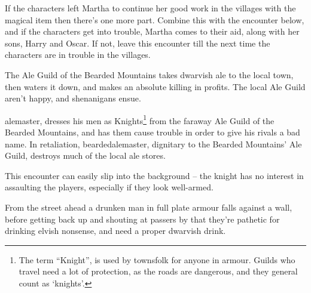 \begin{multicols}{2}



If the characters left Martha to continue her good work in the villages with the magical item then there's one more part.
Combine this with the encounter below, and if the characters get into trouble, Martha comes to their aid, along with her sons, Harry and Oscar.
If not, leave this encounter till the next time the characters are in trouble in the villages.




\stopcontents[sq]


\startcontents[sq]

\sqminitoc

\noindent
The Ale Guild of the Bearded Mountains takes dwarvish ale to the local town, then waters it down, and makes an absolute killing in profits.
The local Ale Guild aren't happy, and shenanigans ensue.

\Gls{alemaster}, dresses his men as Knights\footnote{The term ``Knight'', is used by townsfolk for anyone in armour.
Guilds who travel need a lot of protection, as the roads are dangerous, and they general count as `knights'.}
from the faraway Ale Guild of the Bearded Mountains, and has them cause trouble in order to give his rivals a bad name.
In retaliation, \gls{beardedalemaster}, dignitary to the Bearded Mountains' Ale Guild, destroys much of the local ale stores.


This encounter can easily slip into the background -- the knight has no interest in assaulting the players, especially if they look well-armed.

\begin{boxtext}

	From the street ahead a drunken man in full plate armour falls against a wall, before getting back up and shouting at passers by that they're pathetic for drinking elvish nonsense, and need a proper dwarvish drink.


\end{boxtext}
\end{multicols}
